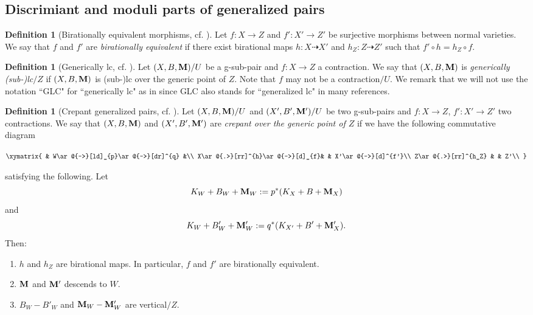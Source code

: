 \documentclass[11pt]{amsart}
\numberwithin{equation}{section}
\newcommand{\Mm}{{\bf{M}}}
\theoremstyle{definition}
\newtheorem{defn}[thm]{Definition}
\theoremstyle{definition}
\theoremstyle{definition}
\begin{document}
\subsection{Discrimiant and moduli parts of generalized pairs}

\begin{defn}[Birationally equivalent morphisms, cf. {\cite[Page 4, Paragraph 2]{ACSS21}}]
Let $f: X\rightarrow Z$ and $f': X'\rightarrow Z'$ be surjective morphisms between normal varieties. We say that $f$ and $f'$ are \emph{birationally equivalent} if there exist birational maps $h: X\dashrightarrow X'$ and $h_Z: Z\dashrightarrow Z'$ such that $f'\circ h=h_Z\circ f$.
\end{defn}

\begin{defn}[Generically lc, cf. {\cite[2.2. Discriminant and Moduli Part]{ACSS21}}]\label{defn: generically lc}
Let  $(X,B,\Mm)/U$ be a g-sub-pair and $f: X\rightarrow Z$ a contraction. We say that $(X,B,\Mm)$ is \emph{generically (sub-)lc$/Z$} if $(X,B,\Mm)$ is (sub-)lc over the generic point of $Z$. Note that $f$ may not be a contraction$/U$. We remark that we will not use the notation ``GLC" for ``generically lc" as in \cite{ACSS21} since GLC also stands for ``generalized lc" in many references.
\end{defn}

\begin{defn}[Crepant generalized pairs, cf. {\cite[Definition 2.3]{ACSS21}}]\label{defn: crepant g-pairs}
Let $(X,B,\Mm)/U$ and $(X',B',\Mm')/U$ be two g-sub-pairs and $f: X\rightarrow Z$, $f': X'\rightarrow Z'$ two contractions. We say that $(X,B,\Mm)$ and $(X',B',\Mm')$ are \emph{crepant over the generic point of $Z$} if we have the following commutative diagram
 \begin{center}$\xymatrix{
& W\ar@{->}[ld]_{p}\ar@{->}[dr]^{q} &\\
X\ar@{.>}[rr]^{h}\ar@{->}[d]_{f}& & X'\ar@{->}[d]^{f'}\\
Z\ar@{.>}[rr]^{h_Z} & & Z'\\
}$
\end{center}
satisfying the following. Let $$K_W+B_W+\Mm_W:=p^*(K_X+B+\Mm_X)$$ and $$K_W+B'_W+\Mm'_W:=q^*(K_{X'}+B'+\Mm'_X).$$ Then:
\begin{enumerate}
    \item $h$ and $h_Z$ are birational maps. In particular, $f$ and $f'$ are birationally equivalent.
    \item $\Mm$ and $\Mm'$ descends to $W$.
    \item $B_W-B'_W$ and $\Mm_W-\Mm'_W$ are vertical$/Z$.
\end{enumerate}
\end{defn}
\end{document}
